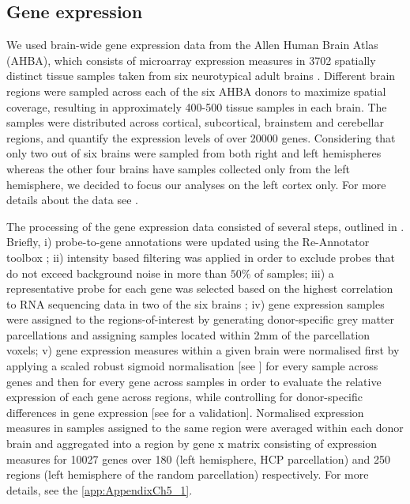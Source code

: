 \subsection{Gene expression}

We used brain-wide gene expression data from the Allen Human Brain Atlas (AHBA), which consists of microarray expression measures in 3702 spatially distinct tissue samples taken from six neurotypical adult brains \citep{Hawrylycz2012}. Different brain regions were sampled across each of the six AHBA donors to maximize spatial coverage, resulting in approximately 400-500 tissue samples in each brain. The samples were distributed across cortical, subcortical, brainstem and cerebellar regions, and quantify the expression levels of over \num{20000} genes. Considering that only two out of six brains were sampled from both right and left hemispheres whereas the other four brains have samples collected only from the left hemisphere, we decided to focus our analyses on the left cortex only. For more details about the data see \citep{Hawrylycz2012}. 

The processing of the gene expression data consisted of several steps, outlined in \citep{Arnatkeviciute2019}. Briefly, i) probe-to-gene annotations were updated using the Re-Annotator toolbox \citep{Arloth2015}; ii) intensity based filtering was applied in order to exclude probes that do not exceed background noise in more than $50\%$ of samples; iii) a representative probe for each gene was selected based on the highest correlation to RNA sequencing data in two of the six brains \citep{Miller2014a}; iv) gene expression samples were assigned to the regions-of-interest by generating donor-specific grey matter parcellations and assigning samples located within 2mm of the parcellation voxels; v) gene expression measures within a given brain were normalised first by applying a scaled robust sigmoid normalisation [see \citet{Arnatkeviciute2019}] for every sample across genes and then for every gene across samples in order to evaluate the relative expression of each gene across regions, while controlling for donor-specific differences in gene expression [see \citet{Arnatkeviciute2019} for a validation]. Normalised expression measures in samples assigned to the same region were averaged within each donor brain and aggregated into a region by gene x matrix consisting of expression measures for \num{10027} genes over 180 (left hemisphere, HCP parcellation) and 250 regions (left hemisphere of the random parcellation) respectively. For more details, see the \ref{app:AppendixCh5_1}. 

